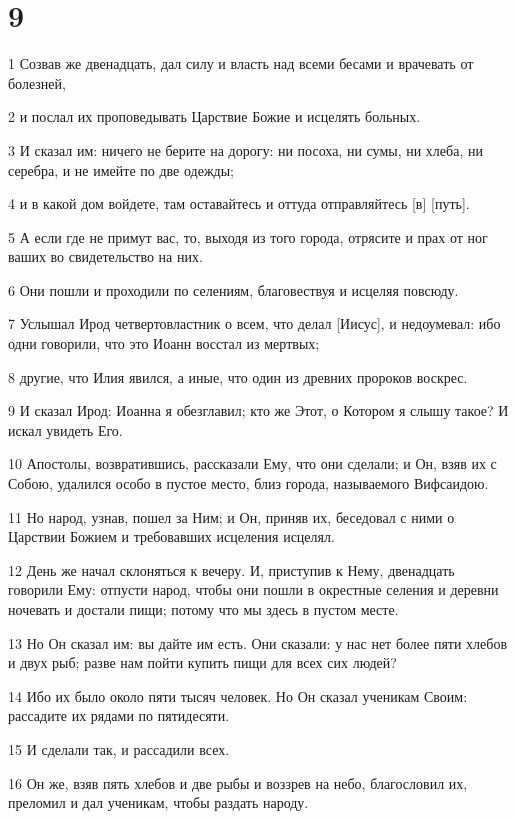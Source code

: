 \chapter{9}

\par 1 Созвав же двенадцать, дал силу и власть над всеми бесами и врачевать от болезней,
\par 2 и послал их проповедывать Царствие Божие и исцелять больных.
\par 3 И сказал им: ничего не берите на дорогу: ни посоха, ни сумы, ни хлеба, ни серебра, и не имейте по две одежды;
\par 4 и в какой дом войдете, там оставайтесь и оттуда отправляйтесь [в] [путь].
\par 5 А если где не примут вас, то, выходя из того города, отрясите и прах от ног ваших во свидетельство на них.
\par 6 Они пошли и проходили по селениям, благовествуя и исцеляя повсюду.
\par 7 Услышал Ирод четвертовластник о всем, что делал [Иисус], и недоумевал: ибо одни говорили, что это Иоанн восстал из мертвых;
\par 8 другие, что Илия явился, а иные, что один из древних пророков воскрес.
\par 9 И сказал Ирод: Иоанна я обезглавил; кто же Этот, о Котором я слышу такое? И искал увидеть Его.
\par 10 Апостолы, возвратившись, рассказали Ему, что они сделали; и Он, взяв их с Собою, удалился особо в пустое место, близ города, называемого Вифсаидою.
\par 11 Но народ, узнав, пошел за Ним; и Он, приняв их, беседовал с ними о Царствии Божием и требовавших исцеления исцелял.
\par 12 День же начал склоняться к вечеру. И, приступив к Нему, двенадцать говорили Ему: отпусти народ, чтобы они пошли в окрестные селения и деревни ночевать и достали пищи; потому что мы здесь в пустом месте.
\par 13 Но Он сказал им: вы дайте им есть. Они сказали: у нас нет более пяти хлебов и двух рыб; разве нам пойти купить пищи для всех сих людей?
\par 14 Ибо их было около пяти тысяч человек. Но Он сказал ученикам Своим: рассадите их рядами по пятидесяти.
\par 15 И сделали так, и рассадили всех.
\par 16 Он же, взяв пять хлебов и две рыбы и воззрев на небо, благословил их, преломил и дал ученикам, чтобы раздать народу.

